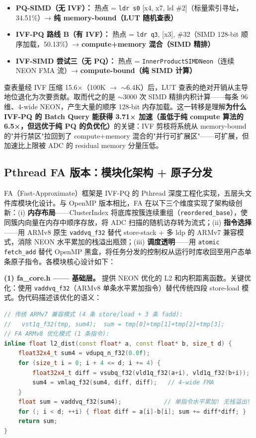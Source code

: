 \documentclass[UTF8,a4paper,10pt]{ctexart}
\begin{document}
\begin{itemize}
\item \textbf{PQ-SIMD（无 IVF）：} 热点 = \texttt{ldr s0} [x4, x7, lsl \#2]（标量索引寻址，34.51\%）→ \textbf{纯 memory-bound（LUT 随机查表）}
\item \textbf{IVF-PQ 路线 B（有 IVF）：} 热点 = \texttt{ldr q3}, [x3], \#32（SIMD 128-bit 顺序加载，50.13\%）→ \textbf{compute+memory 混合（SIMD 精排）}
\item \textbf{IVF-SIMD 尝试三（无 PQ）：} 热点 = \texttt{InnerProductSIMDNeon}（连续 NEON FMA 流）→ \textbf{compute-bound（纯 SIMD 计算）}
\end{itemize}

查表量经 IVF 压缩 15.6×（100K $\to$ $\sim$6.4K）后，LUT 查表的绝对开销从主导地位退化为次要贡献。取而代之的是 $\sim$3000 次 SIMD 精排内积计算——每条 96 维、4-wide NEON，产生大量的顺序 128-bit 内存加载。这一转移是理解\textbf{为什么 IVF-PQ 的 Batch Query 能获得 3.71× 加速（虽低于纯 compute 算法的 6.5×，但远优于纯 PQ 的负优化）}的关键：IVF 剪枝将系统从 memory-bound 的"并行禁区"拉回到了 compute+memory 混合的"并行可扩展区"——可扩展，但加速比上限被 ADC 的 residual memory 分量压低。

\subsection{Pthread FA 版本：模块化架构 + 原子分发}

FA（Fast-Approximate）框架是 IVF-PQ 的 Pthread 深度工程化实现，五层头文件库模块化设计。与 OpenMP 版本相比，FA 在以下三个维度实现了架构级创新：(i) \textbf{内存布局}——ClusterIndex 将底库按簇连续重组（\texttt{reordered\_base}），使同簇内向量在内存中顺序存放，将 ADC 扫描的随机访存转为流式；(ii) \textbf{指令选择}——用 ARMv8 原生 \texttt{vaddvq\_f32} 替代 store-stack + 多 ldp 的 ARMv7 兼容模式，消除 NEON 水平累加的栈溢出瓶颈；(iii) \textbf{调度透明}——用 \texttt{atomic fetch\_add} 替代 OpenMP 黑盒，将任务分发的控制权从运行时库收回至用户态单条原子指令。各模块核心设计如下：

\textbf{(1) fa\_core.h —— 基础层。} 提供 NEON 优化的 L2 和内积距离函数。关键优化：使用 \texttt{vaddvq\_f32}（ARMv8 单条水平累加指令）替代传统四段 store-load 模式。伪代码描述该优化的语义：

\begin{lstlisting}[language=C++, caption={fa\_core.h: NEON L2 距离 —— vaddvq\_f32 替代栈溢出模式}]
// 传统 ARMv7 兼容模式 (4 条 store/load + 3 条 fadd):
//   vst1q_f32(tmp, sum4);  sum = tmp[0]+tmp[1]+tmp[2]+tmp[3];
// FA ARMv8 优化模式 (1 条指令):
inline float l2_dist(const float* a, const float* b, size_t d) {
    float32x4_t sum4 = vdupq_n_f32(0.0f);
    for (size_t i = 0; i + 4 <= d; i += 4) {
        float32x4_t diff = vsubq_f32(vld1q_f32(a+i), vld1q_f32(b+i));
        sum4 = vmlaq_f32(sum4, diff, diff);   // 4-wide FMA
    }
    float sum = vaddvq_f32(sum4);            // 单指令水平累加! 无栈溢出!
    for (; i < d; ++i) { float diff = a[i]-b[i]; sum += diff*diff; }
    return sum;
}
\end{lstlisting}
\end{document}

